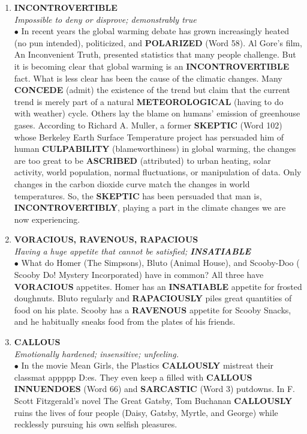 \documentclass{book}
\begin{document}
\begin{enumerate}
\item \textbf{INCONTROVERTIBLE}\\
\textit{Impossible to deny or disprove; demonstrably true}\\

$\bullet$ In recent years the global warming debate has grown increasingly heated (no pun intended), politicized, and \textbf{POLARIZED} (Word 58). Al Gore's film, An Inconvenient Truth, presented statistics that many people challenge. But it is becoming clear that global warming is an \textbf{INCONTROVERTIBLE} fact. What is less clear has been the cause of the climatic changes. Many \textbf{CONCEDE} (admit) the existence of the trend but claim that the current trend is merely part of a natural \textbf{METEOROLOGICAL} (having to do with weather) cycle. Others lay the blame on humans' emission of greenhouse gases. According to Richard A. Muller, a former \textbf{SKEPTIC} (Word 102) whose Berkeley Earth Surface Temperature project has persuaded him of human \textbf{CULPABILITY} (blameworthiness) in global warming, the changes are too great to be \textbf{ASCRIBED} (attributed) to urban heating, solar activity, world population, normal fluctuations, or manipulation of data. Only changes in the carbon dioxide curve match the changes in world temperatures. So, the \textbf{SKEPTIC} has been persuaded that man is, \textbf{INCONTROVERTIBLY}, playing a part in the climate changes we are now experiencing.

\item \textbf{VORACIOUS, RAVENOUS, RAPACIOUS}\\
\textit{  Having a huge appetite that cannot be satisfied; \textbf{INSATIABLE}}\\

$\bullet$ What do Homer (The Simpsons), Bluto (Animal House), and Scooby-Doo ( Scooby Do! Mystery Incorporated) have in common? All three have \textbf{VORACIOUS} appetites. Homer has an \textbf{INSATIABLE} appetite for frosted doughnuts. Bluto regularly and \textbf{RAPACIOUSLY} piles great quantities of food on his plate. Scooby has a \textbf{RAVENOUS} appetite for Scooby Snacks, and he habitually sneaks food from the plates of his friends. 

\item \textbf{CALLOUS}\\
\textit{ Emotionally hardened; insensitive; unfeeling.}\\

$\bullet$ In the movie Mean Girls, the Plastics \textbf{CALLOUSLY} mistreat their classmat appppp D:es. They even keep a  filled with \textbf{CALLOUS} \textbf{INNUENDOES} (Word 66) and \textbf{SARCASTIC} (Word 3) putdowns.  In F. Scott Fitzgerald's novel The Great Gatsby, Tom Buchanan \textbf{CALLOUSLY} ruins the lives of four people (Daisy, Gatsby, Myrtle, and George) while recklessly pursuing his own selfish pleasures.


\end{enumerate}
\end{document}
